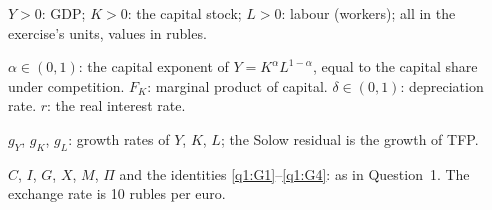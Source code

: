 \resolespaco
\begin{sol}
\begin{notacao}
\item $Y>0$: GDP; $K>0$: the capital stock; $L>0$: labour (workers); all in the exercise's units, values in rubles.
\item $\alpha\in(0,1)$: the capital exponent of $Y=K^{\alpha}L^{1-\alpha}$, equal to the capital share under competition.
$F_K$: marginal product of capital. $\delta\in(0,1)$: depreciation rate. $r$: the real interest rate.
\item $g_Y$, $g_K$, $g_L$: growth rates of $Y$, $K$, $L$; the Solow residual is the growth of TFP.
\item $C$, $I$, $G$, $X$, $M$, $\Pi$ and the identities \eqref{q1:G1}--\eqref{q1:G4}: as in Question~1. The exchange rate is
10 rubles per euro.
\end{notacao}


\end{sol}
